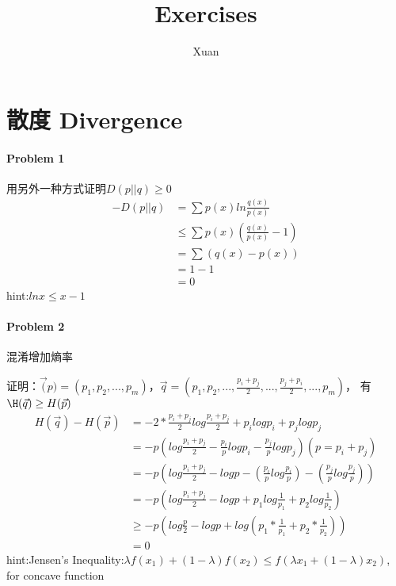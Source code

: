 \documentclass[a4paper, 12pt]{article}
\title{Exercises}
\author{Xuan}
\begin{document}
    \maketitle
    \section{散度 Divergence}
    \paragraph{Problem 1}用另外一种方式证明$D(p||q)\ge 0$
    \begin{equation}
        \begin{aligned}
            -D(p||q)&=\sum p(x)ln\frac{q(x)}{p(x)}\\
            &\le \sum p(x)(\frac{q(x)}{p(x)}-1)\\
            &=\sum (q(x)-p(x))\\
            &=1-1\\
            &=0
        \end{aligned}
    \end{equation}
    hint:$lnx\le x-1$
    \paragraph{Problem 2}混淆增加熵率

    证明：$\vec(p)=(p_1,p_2,...,p_m)$，$\vec{q}=(p_1,p_2,...,\frac{p_i+p_j}{2},...,\frac{p_j+p_i}{2},...,p_m)$，
    有$\H(\vec{q})\ge H(\vec{p})$
    \begin{equation}
        \begin{aligned}
            H(\vec{q})-H(\vec{p})&=-2*\frac{p_i+p_j}{2}log\frac{p_i+p_j}{2}+p_ilogp_i+p_jlogp_j\\
            &=-p(log\frac{p_i+p_j}{2}-\frac{p_i}{p}logp_i-\frac{p_j}{p}logp_j)(p=p_i+p_j)\\
            &=-p(log\frac{p_i+p_j}{2}-logp-(\frac{p_i}{p}log\frac{p_i}{p})-(\frac{p_j}{p}log\frac{p_j}{p}))\\
            &=-p(log\frac{p_i+p_j}{2}-logp+p_1log\frac{1}{p_1}+p_2log\frac{1}{p_2})\\
            &\ge -p(log\frac{p}{2}-logp+log(p_1*\frac{1}{p_1}+p_2*\frac{1}{p_2}))\\
            &=0
        \end{aligned}
    \end{equation}
    hint:Jensen's Inequality:$\lambda f(x_1)+(1-\lambda)f(x_2)\le f(\lambda x_1+(1-\lambda)x_2)$, for concave function
\end{document}
